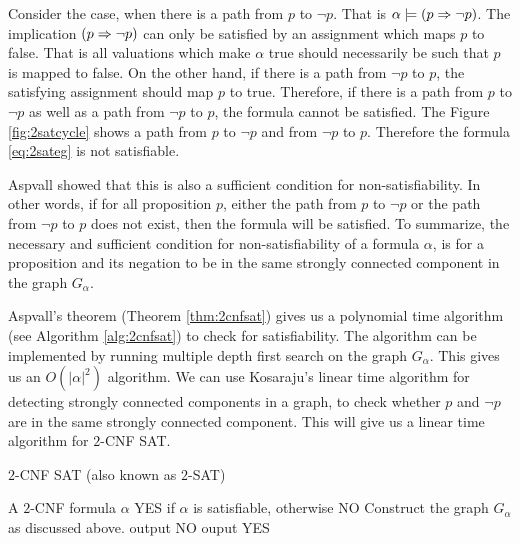Consider the case, when there is a path from $p$ to $\neg p$. That is $\alpha \models (p \Rightarrow \neg p)$. The implication $(p \Rightarrow \neg p)$ can only be satisfied by an assignment which maps $p$ to false. That is all valuations which make $\alpha$ true should necessarily be such that $p$ is mapped to false. On the other hand, if there is a path from $\neg p$ to $p$, the satisfying assignment should map $p$ to true. Therefore, if there is a path from $p$ to $\neg p$ as well as a path from $\neg p$ to $p$, the formula cannot be satisfied. The Figure \ref{fig:2satcycle} shows a path from $p$ to $\neg p$ and from $\neg p$ to $p$. Therefore the formula \ref{eq:2sateg} is not satisfiable.

Aspvall \etal \cite{aspvall_2satlin} showed that this is also a sufficient condition for non-satisfiability. In other words, if for all  proposition $p$, either the path from $p$ to $\neg p$ or the path from $\neg p$ to $p$ does not exist, then the formula will be satisfied. To summarize, the necessary and sufficient condition for non-satisfiability of a formula $\alpha$, is for a proposition and its negation to be in the same strongly connected component in the graph $G_{\alpha}$. 

Aspvall's theorem (Theorem \ref{thm:2cnfsat}) gives us a polynomial time algorithm (see Algorithm \ref{alg:2cnfsat}) to check for satisfiability. The algorithm can be implemented by running multiple depth first search on the graph $G_{\alpha}$. This gives us an $O(|\alpha|^2)$ algorithm. We can use Kosaraju's linear time algorithm for detecting strongly connected components in a graph, to check whether $p$ and $\neg p$ are in the same strongly connected component. This will give us a linear time algorithm for $2$-CNF SAT.
\begin{algorithm}[H]
 \caption{$2$-CNF SAT (also known as $2$-SAT)}
 \label{alg:2cnfsat}
 \begin{algorithmic}[1]
 \renewcommand{\algorithmicrequire}{\textbf{Input:}}
 \renewcommand{\algorithmicensure}{\textbf{Output:}}
 \REQUIRE A $2$-CNF formula $\alpha$ 
 \ENSURE  YES if $\alpha$ is satisfiable, otherwise NO
  \STATE Construct the graph $G_{\alpha}$ as discussed above.
 		 \STATE   output NO
  \ELSE
  		\STATE ouput YES
  \ENDIF
 \end{algorithmic} 
 \end{algorithm}

